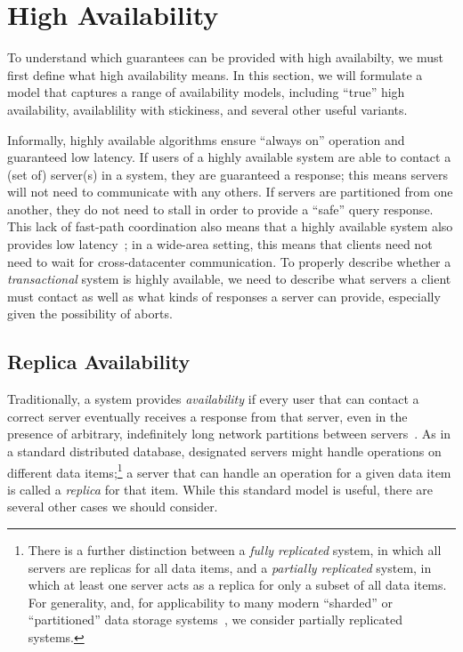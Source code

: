 
\section{High Availability}
\label{sec:availability}

To understand which guarantees can be provided with high availabilty,
we must first define what high availability means. In this section, we
will formulate a model that captures a range of availability models,
including ``true'' high availability, availablility with stickiness,
and several other useful variants.

Informally, highly available algorithms ensure ``always on'' operation
and guaranteed low latency. If users of a highly available system are
able to contact a (set of) server(s) in a system, they are guaranteed
a response; this means servers will not need to communicate with any
others. If servers are partitioned from one another, they do not need
to stall in order to provide a ``safe'' query response. This lack of
fast-path coordination also means that a highly available system also
provides low latency~\cite{abadi-pacelc}; in a wide-area setting, this
means that clients need not need to wait for cross-datacenter
communication. To properly describe whether a \textit{transactional}
system is highly available, we need to describe what servers a client
must contact as well as what kinds of responses a server can provide,
especially given the possibility of aborts.

\subsection{Replica Availability}

Traditionally, a system provides {\em  availability} if every user that
can contact a correct server eventually receives a response from that server,
even in the presence of arbitrary, indefinitely long network
partitions between servers~\cite{gilbert-cap}. As in a standard
distributed database, designated servers might handle operations on
different data items;\footnote{There is a further distinction between
  a \textit{fully replicated} system, in which all servers are
  replicas for all data items, and a \textit{partially replicated}
  system, in which at least one server acts as a replica for only a
  subset of all data items. For generality, and, for applicability to
  many modern ``sharded'' or ``partitioned'' data storage
  systems~\cite{dynamo, pnuts, bigtable, spanner, hstore}, we consider partially
  replicated systems.} a server that can handle an operation for a
given data item is called a \textit{replica} for that item. While this
standard model is useful, there are several other cases we should
consider.


